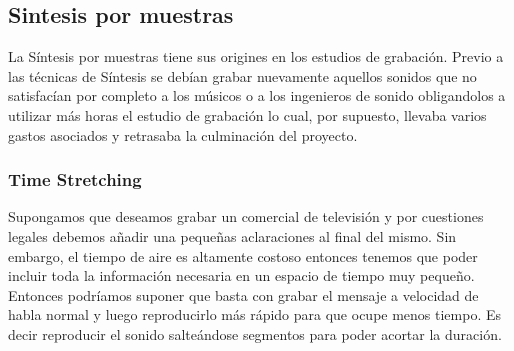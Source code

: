 



\subsection{Sintesis por muestras}
La Síntesis por muestras tiene sus origines en los estudios de grabación. Previo a las técnicas de Síntesis
se debían grabar nuevamente aquellos sonidos que no satisfacían por completo a los músicos o a los ingenieros de sonido obligandolos a utilizar más horas el estudio de grabación
lo cual, por supuesto, llevaba varios gastos asociados y retrasaba la culminación del proyecto.

\subsubsection{Time Stretching}
Supongamos que deseamos grabar un comercial de televisión y por cuestiones legales debemos añadir una pequeñas aclaraciones al final del mismo. Sin embargo, el tiempo de aire es altamente costoso entonces tenemos que poder incluir toda la información necesaria en un espacio de tiempo muy pequeño. Entonces podríamos suponer que basta con grabar el mensaje a velocidad de habla normal y luego reproducirlo más rápido para que ocupe menos tiempo. Es decir reproducir el sonido salteándose segmentos para poder acortar la duración. 

